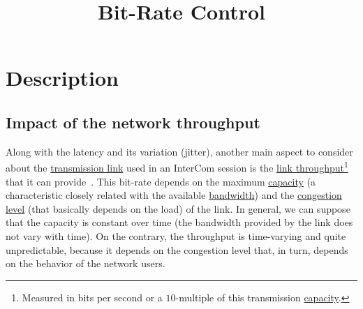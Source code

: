 
\title{Bit-Rate Control}


\maketitle

\tableofcontents

\section{Description}
\subsection{Impact of the network throughput}
Along with the latency and its variation (jitter), another main aspect
to consider about the
\href{https://en.wikipedia.org/wiki/Telecommunications_link}{transmission
  link} used in an InterCom session is the
\href{https://en.wikipedia.org/wiki/Channel_capacityhttps://en.wikipedia.org/wiki/Network_throughput}{link
  throughput}\footnote{Measured in bits per second or a $10$-multiple
  of this transmission
  \href{https://en.wikipedia.org/wiki/Bandwidth_(computing)}{capacity}.}
that it can provide~\cite{Forouzan,Tanenbaum}. This bit-rate depends on
the maximum
\href{https://en.wikipedia.org/wiki/Channel_capacity}{capacity} (a
characteristic closely related with the available
\href{https://en.wikipedia.org/wiki/Bandwidth_(signal_processing)}{bandwidth})
and the
\href{https://en.wikipedia.org/wiki/Network_congestion}{congestion
  level} (that basically depends on the load) of the link. In general,
we can suppose that the capacity is constant over time (the
bandwidth provided by the link does not vary with time). On the
contrary, the throughput is time-varying and quite unpredictable,
because it depends on the congestion level that, in turn, depends
on the behavior of the network users.

